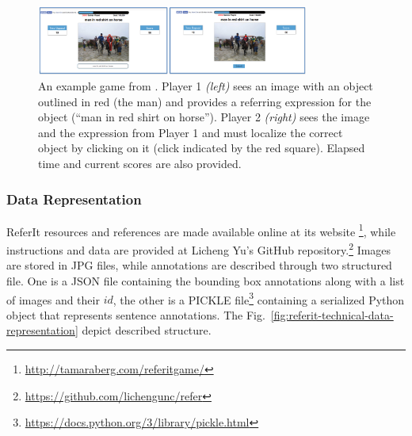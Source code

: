 \begin{figure}
  \centering
  \includegraphics[width=0.8\textwidth]{figures/referitgame-example.png}
  \caption[ReferIt Game Example.]{An example game from
  \cite{kazemzadeh2014referitgame}. Player 1 \textit{(left)} sees an
  image with an object outlined in red (the man) and provides a
  referring expression for the object (``man in red shirt on horse'').
  Player 2 \textit{(right)} sees the image and the expression from
  Player 1 and must localize the correct object by clicking on it
  (click indicated by the red square). Elapsed time and current scores
  are also provided. }
  \label{fig:referitgame-example}
\end{figure}

\subsubsection{Data Representation}
\label{subsec:referit-data-representation}

ReferIt resources and references are made available online at its
website
\footnote{\href{http://tamaraberg.com/referitgame/}{http://tamaraberg.com/referitgame/}},
while instructions and data are provided at Licheng Yu's GitHub
repository.\footnote{\href{https://github.com/lichengunc/refer}{https://github.com/lichengunc/refer}}
Images are stored in JPG files, while annotations are described
through two structured file. One is a JSON file containing the
bounding box annotations along with a list of images and their $id$,
the other is a PICKLE
file\footnote{\href{https://docs.python.org/3/library/pickle.html}{https://docs.python.org/3/library/pickle.html}}
containing a serialized Python object that represents sentence
annotations. The Fig.~\ref{fig:referit-technical-data-representation}
depict described structure.

